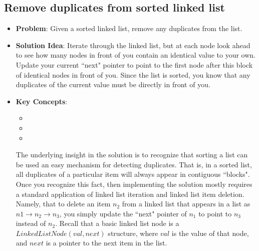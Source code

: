 \documentclass[10pt,a4paper]{article}
\begin{document}
\subsection*{Remove duplicates from sorted linked list}
\begin{itemize}
\item \textbf{Problem}: Given a sorted linked list, remove any duplicates from the list.
\item \textbf{Solution Idea}: Iterate through the linked list, but at each node look ahead to see how many nodes in front of you contain an identical value to your own. Update your current ``next" pointer to point to the first node after this block of identical nodes in front of you. Since the list is sorted, you know that any duplicates of the current value must be directly in front of you.
\item \textbf{Key Concepts}: 
\begin{itemize}
    \item {}
    \item {}
    \item {}
\end{itemize}
The underlying insight in the solution is to recognize that sorting a list can be used an easy mechanism for detecting duplicates. That is, in a sorted list, all duplicates of a particular item will always appear in contiguous ``blocks". Once you recognize this fact, then implementing the solution mostly requires a standard application of linked list iteration and linked list item deletion. Namely, that to delete an item $n_2$ from a linked list that appears in a list as $n1 \rightarrow n_2 \rightarrow n_3$, you simply update  the ``next" pointer of $n_1$ to point to $n_3$ instead of $n_2$. Recall that a basic linked list node is a $LinkedListNode(val, next)$ structure, where $val$ is the value of that node, and $next$ is a pointer to the next item in the list.
\end{itemize}
\end{document}
